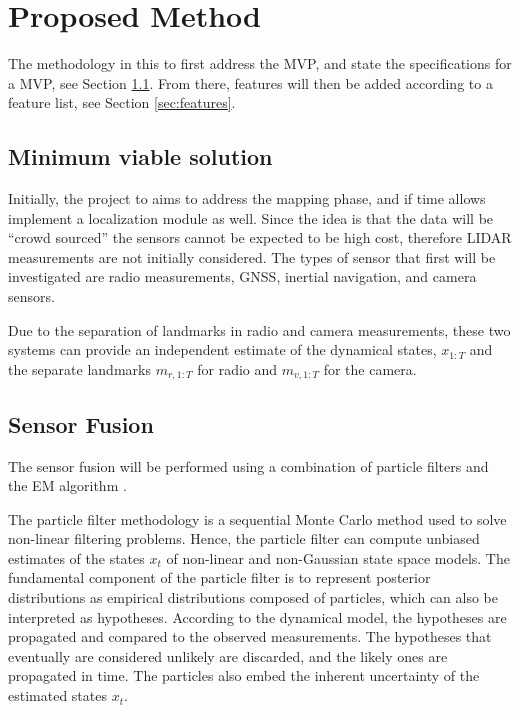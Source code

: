 \section{Proposed Method}

The methodology in this to first address the \gls{MVP}, and state the
specifications for a \gls{MVP}, see Section \ref{sec:mvs}. From there, features
will then be added
according to a feature list, see Section \ref{sec:features}.

\subsection{Minimum viable solution}\label{sec:mvs}

Initially, the project to aims to address the mapping phase, and if time allows
implement a localization module as well. Since the idea is that the data will
be ``crowd sourced'' the sensors cannot be expected to be high cost, therefore
\gls{LIDAR} measurements are not initially considered. The types of sensor that
first will be investigated are radio measurements, \gls{GNSS}, inertial
navigation, and camera sensors.

Due to the separation of landmarks in radio and camera measurements, these two
systems can provide an independent estimate of the dynamical states, $x_{1:T}$
and the separate landmarks $m_{r,1:T}$ for radio and $m_{v,1:T}$ for the
camera.

\subsection{Sensor Fusion}

The sensor fusion will be performed using a combination of particle
filters and the \gls{EM} algorithm
\cite{DBLP:journals/automatica/SchonWN11}.

The particle filter
\cite{210672} methodology is a sequential Monte Carlo method used to
solve non-linear filtering problems. Hence, the particle filter can
compute unbiased estimates of the
states $x_{t}$  of non-linear and non-Gaussian state space models. The
fundamental component of the particle filter is to represent posterior
distributions as empirical distributions composed of particles, which
can also be interpreted as hypotheses. According to the dynamical
model, the hypotheses are propagated and
compared to the observed measurements. The hypotheses that eventually
are considered unlikely are discarded, and the likely ones are
propagated in time. The particles also embed the inherent uncertainty
of the estimated states $x_t$.

